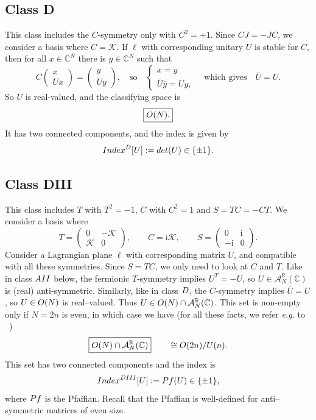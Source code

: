 \documentclass[11pt]{amsart}
\numberwithin{equation}{section} %
\newcommand\1{{\mathds 1}}
\def\C{{\mathbb C}}
\def\CC{{\mathbb C}}
\def\RR{{\mathbb R}}
\def\ri{{\mathrm{i}}}
\def\cA{{\mathcal A}}
\def\cK{{\mathcal K}}
\def\rD{{\rm D}}
\def\rDIII{{\rm DIII}}
\def\rAII{{\rm AII}}
\def\U{{\rm U}}
\def\O{{\rm O}}
\def\Index{{\rm Index}}
\def\det{{\rm det}}
\def\Pf{{\rm Pf}}
\begin{document}
\subsection{Class D}
\label{sec:class_D}

This class includes the $C$-symmetry only with $C^2=+1$. Since $CJ=-JC$, we consider a basis where $C = \cK$. If $\ell$ with corresponding unitary $U$ is stable for $C$, then for all $x \in \CC^N$ there is $y \in \CC^N$ such that
$$
C \begin{pmatrix}	x  \\	U x \end{pmatrix} = 
\begin{pmatrix}	y  \\	U y  \end{pmatrix},
\quad \text{so} \quad
\begin{cases}
    \overline{x} = y \\
    \overline{U} \overline{y} = Uy,
\end{cases}
\quad \text{which gives} \quad
\overline{U}= U.
$$
So $U$ is real-valued, and the classifying space is 
\[
    \boxed{ \O(N). }
\]
It has two connected components, and the index is given by
$$ \Index^{\rD} [U] := \det (U) \in \{\pm 1\}.$$

\subsection{Class DIII} 
\label{sec:class_DIII}

This class includes $T$ with $T^2=-1$, $C$ with $C^2=1$ and $S=TC = - CT$. We consider a basis where
$$
T =  \begin{pmatrix}
0 & -\cK\\
\cK & 0
\end{pmatrix}, \qquad C= \ri\cK, \qquad S = \begin{pmatrix}
0 & \ri \\
-\ri & 0
\end{pmatrix}.
$$
Consider a Lagrangian plane $\ell$ with corresponding matrix $U$, and compatible with all these symmetries. Since $S=TC$, we only need to look at $C$ and $T$. Like in class $\rAII$ below, the fermionic $T$-symmetry implies $U^T=-U$, so $U \in \cA^\RR_N(\C)$ is (real) anti-symmetric. Similarly, like in class $\rD$, the $C$-symmetry implies $\overline{U}=U$, so $U \in \O(N)$ is real--valued. Thus  $U\in \O(N)\cap \cA^\RR_N(\C)$. This set is non-empty only if $N=2n$ is even, in which case we have (for all these facts, we refer {\em e.g.} to ~\cite[Cor. A4]{GonMonPer-22})
$$
    \boxed{ \O(N)\cap \cA^\RR_N(\C)} \qquad  \cong \O(2n)/\U(n).
$$
This set has two connected components and the index is 
$$ \Index^{\rDIII}[U] := \Pf(U) \in \{\pm 1\},$$ where $\Pf$ is the Pfaffian. Recall that the Pfaffian is well-defined for anti--symmetric matrices of even size.
\end{document}
